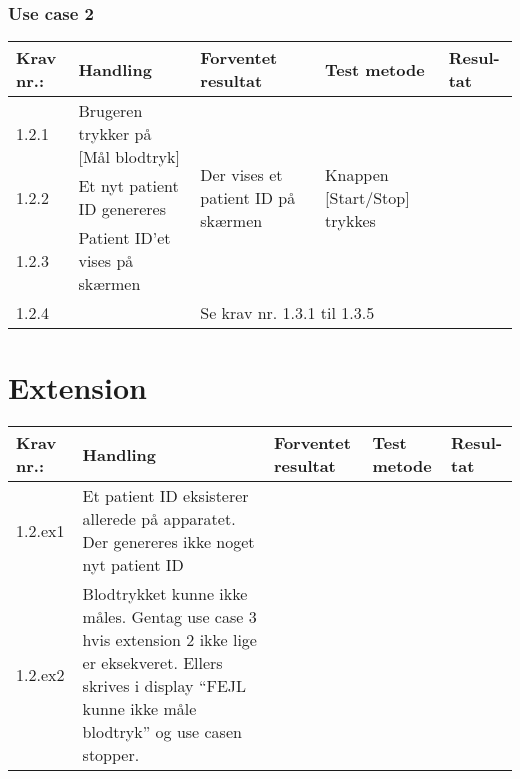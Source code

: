 \documentclass[11pt]{article}
\begin{document}
	\subsection{Use case 2}
	\begin{center}
		\begin{longtable}{|p{1.5cm}|p{2cm}|p{3cm}|p{3cm}|p{1.1cm}|}
			\hline
			Krav nr.: & Handling & Forventet resultat & Test metode & Resul-tat  \\\hline
			1.2.1 & Brugeren trykker på [Mål blodtryk] & \multirow{3}{3cm}{Der vises et patient ID på skærmen} & \multirow{3}{3cm}{Knappen [Start/Stop] trykkes} & \multirow{3}{3cm}{}  \\ \cline{1-2} 
			1.2.2 & Et nyt patient ID genereres & & &  \\ \cline{1-2}
			1.2.3 & Patient ID’et vises på skærmen & & &  \\ \hline
			1.2.4 & & \multicolumn{3}{l|}{Se krav nr. 1.3.1 til 1.3.5} \\ 
			\hline
			
		\end{longtable}
	\end{center}
	
	\chapter{Extension}
	\begin{center}
		\begin{longtable}{|p{1.5cm}|p{2cm}|p{3cm}|p{3cm}|p{1.1cm}|}
			\hline
			Krav nr.: & Handling & Forventet resultat & Test metode & Resul-tat  \\\hline
			1.2.ex1 & Et patient ID eksisterer allerede på apparatet. Der genereres ikke noget nyt patient ID & & &  \\ \hline
			1.2.ex2 & Blodtrykket kunne ikke måles. Gentag use case 3 hvis extension 2 ikke lige er eksekveret. Ellers skrives i display “FEJL kunne ikke måle blodtryk” og use casen stopper.  & & & \\ \hline
		\end{longtable}
	\end{center}
	
	\pagebreak
\end{document}
